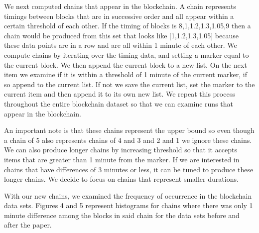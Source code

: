 \documentclass{sig-alternate-05-2015}
\begin{document}
We next computed chains that appear in the blockchain. A chain represents timings between blocks that are in successive order and all appear within a certain threshold of each other. If the timing of blocks is 8,1,1.2,1.3,1.05,9 then a chain would be produced from this set that looks like [1,1.2,1.3,1.05] because these data points are in a row and are all within 1 minute of each other. We compute chains by iterating over the timing data, and setting a marker equal to the current block. We then append the current block to a new list. On the next item we examine if it is within a threshold of 1 minute of the current marker, if so append to the current list. If not we save the current list, set the marker to the current item and then append it to its own new list. We repeat this process throughout the entire blockchain dataset so that we can examine runs that appear in the blockchain. 

An important note is that these chains represent the upper bound so even though a chain of 5 also represents chains of 4 and 3 and 2 and 1 we ignore these chains. We can also produce longer chains by increasing threshold so that it accepts items that are greater than 1 minute from the marker. If we are interested in chains that have differences of 3 minutes or less, it can be tuned to produce these longer chains. We decide to focus on chains that represent smaller durations.    

With our new chains, we examined the frequency of occurrence in the blockchain data sets. Figures 4 and 5 represent histograms for chains where there was only 1 minute difference among the blocks in said chain for the data sets before and after the paper.
\end{document}
